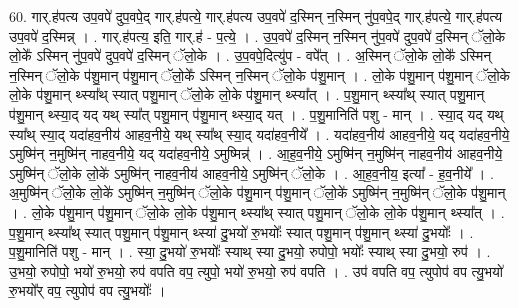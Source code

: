 \documentclass[17pt]{extarticle}
\begin{document}
60. गार्.ह॑पत्य उप॒वपे॑ दुप॒वपे॒द् गार्.ह॑पत्ये॒ गार्.ह॑पत्य उप॒वपे॑ द॒स्मिन् न॒स्मिन् नु॑प॒वपे॒द् गार्.ह॑पत्ये॒ गार्.ह॑पत्य उप॒वपे॑ द॒स्मिन्न् । . गार्.ह॑पत्य॒ इति॒ गार्.ह॑ - प॒त्ये॒ । . उ॒प॒वपे॑ द॒स्मिन् न॒स्मिन् नु॑प॒वपे॑ दुप॒वपे॑ द॒स्मिन् ॅलो॒के लो॒के᳚ ऽस्मिन् नु॑प॒वपे॑ दुप॒वपे॑ द॒स्मिन् ॅलो॒के । . उ॒प॒वपे॒दित्यु॑प - वपे᳚त् । . अ॒स्मिन् ॅलो॒के लो॒के᳚ ऽस्मिन् न॒स्मिन् ॅलो॒के प॑शु॒मान् प॑शु॒मान् ॅलो॒के᳚ ऽस्मिन् न॒स्मिन् ॅलो॒के प॑शु॒मान् । . लो॒के प॑शु॒मान् प॑शु॒मान् ॅलो॒के लो॒के प॑शु॒मान् थ्स्या᳚थ् स्यात् पशु॒मान् ॅलो॒के लो॒के प॑शु॒मान् थ्स्या᳚त् । . प॒शु॒मान् थ्स्या᳚थ् स्यात् पशु॒मान् प॑शु॒मान् थ्स्या॒द् यद् यथ् स्या᳚त् पशु॒मान् प॑शु॒मान् थ्स्या॒द् यत् । . प॒शु॒मानिति॑ पशु - मान् । . स्या॒द् यद् यथ् स्या᳚थ् स्या॒द् यदा॑हव॒नीय॑ आहव॒नीये॒ यथ् स्या᳚थ् स्या॒द् यदा॑हव॒नीये᳚ । . यदा॑हव॒नीय॑ आहव॒नीये॒ यद् यदा॑हव॒नीये॒ ऽमुष्मि॑न् न॒मुष्मि॑न् नाहव॒नीये॒ यद् यदा॑हव॒नीये॒ ऽमुष्मिन्न्॑ । . आ॒ह॒व॒नीये॒ ऽमुष्मि॑न् न॒मुष्मि॑न् नाहव॒नीय॑ आहव॒नीये॒ ऽमुष्मि॑न् ॅलो॒के लो॒के॑ ऽमुष्मि॑न् नाहव॒नीय॑ आहव॒नीये॒ ऽमुष्मि॑न् ॅलो॒के । . आ॒ह॒व॒नीय॒ इत्या᳚ - ह॒व॒नीये᳚ । . अ॒मुष्मि॑न् ॅलो॒के लो॒के॑ ऽमुष्मि॑न् न॒मुष्मि॑न् ॅलो॒के प॑शु॒मान् प॑शु॒मान् ॅलो॒के॑ ऽमुष्मि॑न् न॒मुष्मि॑न् ॅलो॒के प॑शु॒मान् । . लो॒के प॑शु॒मान् प॑शु॒मान् ॅलो॒के लो॒के प॑शु॒मान् थ्स्या᳚थ् स्यात् पशु॒मान् ॅलो॒के लो॒के प॑शु॒मान् थ्स्या᳚त् । . प॒शु॒मान् थ्स्या᳚थ् स्यात् पशु॒मान् प॑शु॒मान् थ्स्या॑ दु॒भयो॑ रु॒भयोः᳚ स्यात् पशु॒मान् प॑शु॒मान् थ्स्या॑ दु॒भयोः᳚ । . प॒शु॒मानिति॑ पशु - मान् । . स्या॒ दु॒भयो॑ रु॒भयोः᳚ स्याथ् स्या दु॒भयो॒ रुपोपो॒ भयोः᳚ स्याथ् स्या दु॒भयो॒ रुप॑ । . उ॒भयो॒ रुपोपो॒ भयो॑ रु॒भयो॒ रुप॑ वपति वप॒ त्युपो॒ भयो॑ रु॒भयो॒ रुप॑ वपति । . उप॑ वपति वप॒ त्युपोप॑ वप त्यु॒भयो॑ रु॒भयो᳚र् वप॒ त्युपोप॑ वप त्यु॒भयोः᳚ । \newline
\end{document}

